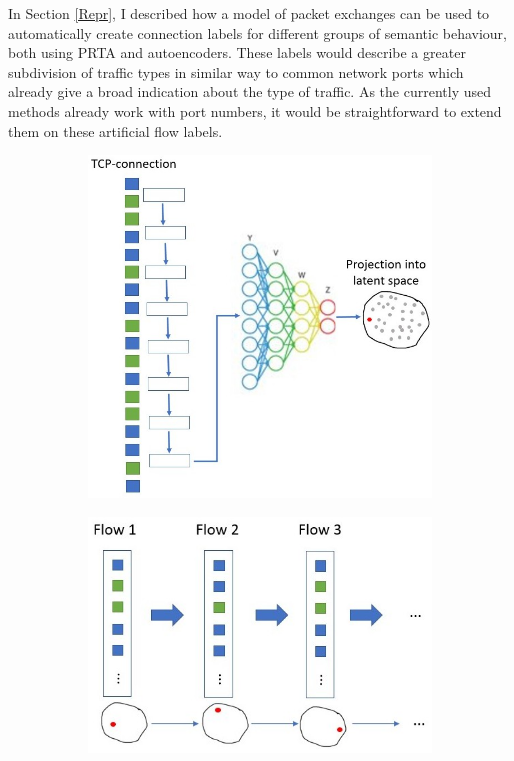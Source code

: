 \documentclass[a4paper,12pt,twoside]{report}
\begin{document}
In Section \ref{Repr}, I described how a model of packet exchanges can be used to automatically create connection labels for different groups of semantic behaviour, both using PRTA and autoencoders. These labels would describe a greater subdivision of traffic types in similar way to common network ports which already give a broad indication about the type of traffic. As the currently used methods already work with port numbers, it would be straightforward to extend them on these artificial flow labels.


\begin{figure}\label{LSTM_Enc}
\centering
\begin{subfigure}[b]{0.45\textwidth}
\includegraphics[width=\textwidth]{images/Latspace1.jpg}
\caption{}\label{Lat1}
\end{subfigure}
\hspace{0.5cm}
\begin{subfigure}[b]{0.45\textwidth}
\includegraphics[width=\textwidth]{images/Latspace2.jpg}

\end{subfigure}
\end{figure}
\end{document}
